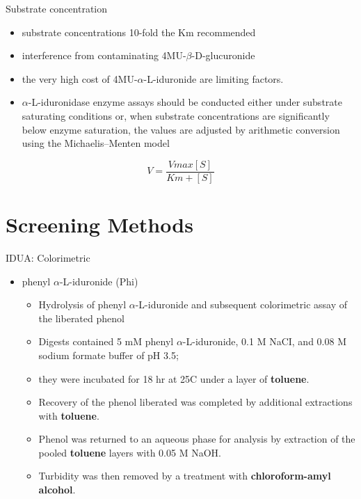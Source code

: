 \documentclass[presentation, smaller]{beamer}
\begin{document}
\begin{frame}[label={sec:orgheadline7}]{Substrate concentration}
\begin{itemize}
\item substrate concentrations 10-fold the Km recommended
\item interference from contaminating 4MU-\(\beta\)-D-glucuronide
\item the very high cost of 4MU-\(\alpha\)-L-iduronide are limiting factors.

\item \(\alpha\)-L-iduronidase enzyme assays should be conducted either under
substrate saturating conditions or, when substrate concentrations
are significantly below enzyme saturation, the values are adjusted
by arithmetic conversion using the Michaelis–Menten model
\end{itemize}

\[ 
V  = \frac{Vmax[S]}{Km + [S]}
\]
\end{frame}
\section{Screening Methods}
\label{sec:orgheadline17}


\begin{frame}[label={sec:orgheadline9}]{IDUA: Colorimetric}
\begin{itemize}
\item phenyl \(\alpha\)-L-iduronide (Phi)
\begin{itemize}
\item Hydrolysis of phenyl \(\alpha\)-L-iduronide and subsequent
colorimetric assay of the liberated phenol
\item Digests contained 5 mM phenyl \(\alpha\)-L-iduronide, 0.1 M NaCI,
and 0.08 M sodium formate buffer of pH 3.5;
\item they were incubated for 18 hr at 25\degree C under a layer of \textbf{toluene}.
\item Recovery of the phenol liberated was completed by additional extractions with \textbf{toluene}.
\item Phenol was returned to an aqueous phase for analysis by extraction of the pooled \textbf{toluene} layers with 0.05 M NaOH.
\item Turbidity was then removed by a treatment with \textbf{chloroform-amyl alcohol}.
\end{itemize}
\end{itemize}
\end{frame}
\end{document}
